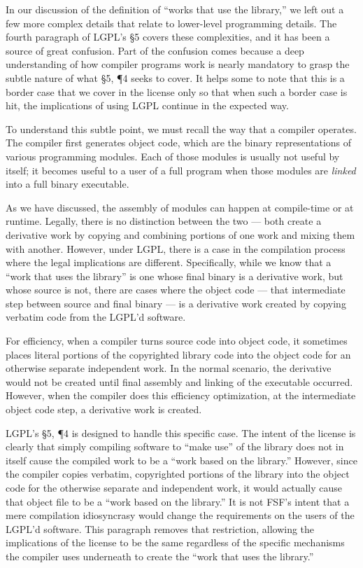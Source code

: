 \documentclass[11pt, letterpaper]{book}
\begin{document}
In our discussion of the definition of ``works that use the library,'' we
left out a few more complex details that relate to lower-level programming
details. The fourth paragraph of LGPL's \S 5 covers these complexities,
and it has been a source of great confusion. Part of the confusion comes
because a deep understanding of how compiler programs work is nearly
mandatory to grasp the subtle nature of what \S 5, \P 4 seeks to
cover. It helps some to note that this is a border case that we cover in
the license only so that when such a border case is hit, the implications
of using LGPL continue in the expected way.

To understand this subtle point, we must recall the way that a compiler
operates. The compiler first generates object code, which are the binary
representations of various programming modules. Each of those modules is
usually not useful by itself; it becomes useful to a user of a full program
when those modules are {\em linked\/} into a full binary executable.

As we have discussed, the assembly of modules can happen at compile-time
or at runtime. Legally, there is no distinction between the two --- both
create a derivative work by copying and combining portions of one work and
mixing them with another. However, under LGPL, there is a case in the
compilation process where the legal implications are different.
Specifically, while we know that a ``work that uses the library'' is one
whose final binary is a derivative work, but whose source is not, there
are cases where the object code --- that intermediate step between source
and final binary --- is a derivative work created by copying verbatim code
from the LGPL'd software.

For efficiency, when a compiler turns source code into object code, it
sometimes places literal portions of the copyrighted library code into the
object code for an otherwise separate independent work. In the normal
scenario, the derivative would not be created until final assembly and
linking of the executable occurred. However, when the compiler does this
efficiency optimization, at the intermediate object code step, a
derivative work is created.

LGPL's \S 5, \P 4 is designed to handle this specific case. The intent of
the license is clearly that simply compiling software to ``make use'' of
the library does not in itself cause the compiled work to be a ``work
based on the library.''  However, since the compiler copies verbatim,
copyrighted portions of the library into the object code for the otherwise
separate and independent work, it would actually cause that object file to be a
``work based on the library.''  It is not FSF's intent that a mere
compilation idiosyncrasy would change the requirements on the users of the
LGPL'd software. This paragraph removes that restriction, allowing the
implications of the license to be the same regardless of the specific
mechanisms the compiler uses underneath to create the ``work that uses the
library.''
\end{document}
